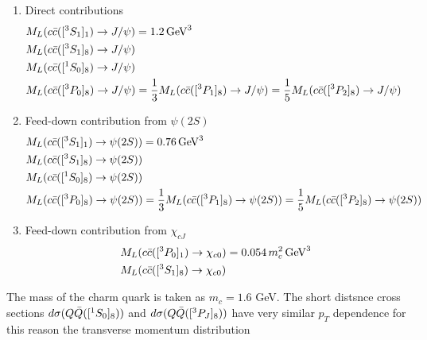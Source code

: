 \documentclass[aps,prc,preprint,superscriptaddress,showpacs,showkeys,amsmath]{revtex4-1}
\begin{document}
\begin{enumerate}
\item{Direct contributions
\begin{equation}
\begin{split}
&M_{L}(c{\bar{c}}([^3S_1]_{1})\rightarrow J/\psi) = 1.2\,{\rm GeV}^{3}\\
&M_{L}(c{\bar{c}}([^3S_1]_{8})\rightarrow J/\psi) \\
&M_{L}(c{\bar{c}}([^1S_0]_{8})\rightarrow J/\psi) \\
&M_{L}(c{\bar{c}}([^3P_0]_{8})\rightarrow J/\psi) = \frac{1}{3} M_{L}(c{\bar{c}}([^3P_1]_{8})\rightarrow J/\psi) 
  =\frac{1}{5} M_{L}(c{\bar{c}}([^3P_2]_{8})\rightarrow J/\psi) 
~\label{eq:Mpsi1}
\end{split}
\end{equation}
    }
\item{Feed-down contribution from $\psi(2S)$
\begin{equation}
\begin{split}
&M_{L}(c{\bar{c}}([^3S_1]_{1})\rightarrow \psi(2S)) = 0.76\,{\rm GeV}^{3}\\
&M_{L}(c{\bar{c}}([^3S_1]_{8})\rightarrow \psi(2S)) \\
&M_{L}(c{\bar{c}}([^1S_0]_{8})\rightarrow \psi(2S)) \\
&M_{L}(c{\bar{c}}([^3P_0]_{8})\rightarrow \psi(2S)) =\frac{1}{3} M_{L}(c{\bar{c}}([^3P_1]_{8})\rightarrow \psi(2S))
  =\frac{1}{5} M_{L}(c{\bar{c}}([^3P_2]_{8})\rightarrow \psi(2S))
~\label{eq:Mpsi2}
\end{split}
\end{equation}
  }
\item{Feed-down contribution from $\chi_{cJ}$
\begin{equation}
\begin{split}
&M_{L}(c{\bar{c}}([^3P_0]_{1})\rightarrow \chi_{c0}) = 0.054\,m_{c}^{2}\,{\rm GeV}^{3}\\ 
&M_{L}(c{\bar{c}}([^3S_1]_{8})\rightarrow \chi_{c0})
~\label{eq:Mchi}
\end{split}
\end{equation}
    }
\end{enumerate}
The mass of the charm quark is taken as $m_{c}=1.6$ GeV. The short distsnce cross 
sections $d\sigma(Q{\bar{Q}}([^1S_0]_{8}))$ and $d\sigma(Q{\bar{Q}}([^3P_J]_{8}))$ have
very similar $p_{T}$ dependence for this reason the transverse momentum distribution 
\end{document}
